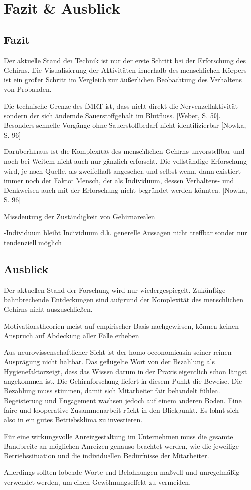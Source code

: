 \newpage
\section{Fazit \& Ausblick} %

\subsection{Fazit}
Der aktuelle Stand der Technik ist nur der erste Schritt bei der Erforschung des Gehirns. Die Visualisierung der Aktivitäten innerhalb des menschlichen Körpers ist ein großer Schritt im Vergleich zur äußerlichen Beobachtung des Verhaltens von Probanden. 

Die technische Grenze des fMRT ist, dass nicht direkt die Nervenzellaktivität sondern der sich ändernde Sauerstoffgehalt im Blutfluss. [Weber, S. 50]. Besonders schnelle Vorgänge ohne Sauerstoffbedarf nicht identifizierbar [Nowka, S. 96]

Darüberhinaus ist die Komplexität des menschlichen Gehirns unvorstellbar und noch bei Weitem nicht auch nur gänzlich erforscht. Die vollständige Erforschung wird, je nach Quelle, als zweifelhaft angesehen und selbst wenn, dann existiert immer noch der Faktor Mensch, der als Individuum, dessen Verhaltens- und Denkweisen auch mit der Erforschung nicht begründet werden könnten. [Nowka, S. 96]

Missdeutung der Zuständigkeit von Gehirnarealen

-Individuum bleibt Individuum d.h. generelle Aussagen nicht treffbar sonder nur tendenziell möglich

\subsection{Ausblick}
Der aktuellen Stand der Forschung wird nur wiedergespiegelt. Zukünftige bahnbrechende Entdeckungen sind aufgrund der Komplexität des menschlichen Gehirns nicht auszuschließen. 

Motivationstheorien meist auf empirischer Basis nachgewiesen, können keinen Anspruch auf Abdeckung aller Fälle erheben

\glqq Aus neurowissenschaftlicher Sicht ist der \glqq homo oeconomicus\grqq in seiner reinen Ausprägung nicht haltbar. Das geflügelte Wort von \glqq der Bezahlung als Hygienefaktor\grqq zeigt, dass das Wissen darum in der Praxis eigentlich schon längst angekommen ist. Die Gehirnforschung liefert in diesem Punkt die Beweise. Die Bezahlung muss stimmen, damit sich Mitarbeiter fair behandelt fühlen. Begeisterung und Engagement wachsen jedoch auf einem anderen Boden. Eine faire und kooperative Zusammenarbeit rückt in den Blickpunkt. Es lohnt sich also in ein gutes Betriebsklima zu investieren.\grqq [Seelbach, S. 19]

\glqq Für eine wirkungsvolle Anreizgestaltung im Unternehmen muss die gesamte Bandbreite an möglichen Anreizen genauso beachtet werden, wie die jeweilige Betriebssituation und die individuellen Bedürfnisse der Mitarbeiter.\grqq [Nowka, S. 54]

Allerdings sollten lobende Worte und Belohnungen maßvoll und unregelmäßig verwendet werden, um einen Gewöhnungseffekt zu vermeiden.\grqq [Nowka, S. 88]